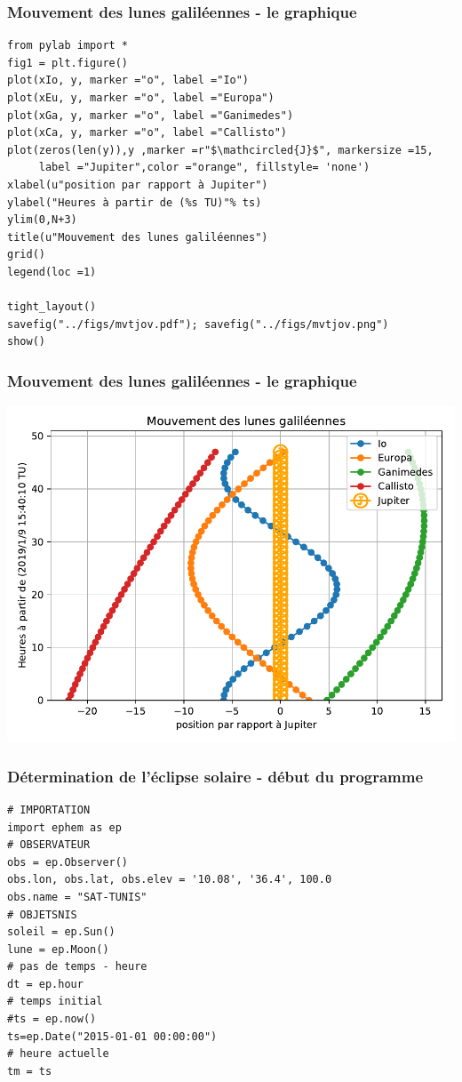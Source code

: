 \documentclass{beamer}
\begin{document}
\begin{frame}
\frametitle{Mouvement des lunes galiléennes - le graphique}

\begin{verbatim}
from pylab import *
fig1 = plt.figure()
plot(xIo, y, marker ="o", label ="Io")
plot(xEu, y, marker ="o", label ="Europa")
plot(xGa, y, marker ="o", label ="Ganimedes")
plot(xCa, y, marker ="o", label ="Callisto")
plot(zeros(len(y)),y ,marker =r"$\mathcircled{J}$", markersize =15,
     label ="Jupiter",color ="orange", fillstyle= 'none')
xlabel(u"position par rapport à Jupiter")
ylabel("Heures à partir de (%s TU)"% ts)
ylim(0,N+3)
title(u"Mouvement des lunes galiléennes")
grid()
legend(loc =1)

tight_layout()
savefig("../figs/mvtjov.pdf"); savefig("../figs/mvtjov.png")
show()
\end{verbatim}
\end{frame}

\begin{frame}
\frametitle{Mouvement des lunes galiléennes - le graphique}

\vspace{6mm}

\centerline{\includegraphics[width=0.9\linewidth]{figs/mvtjov.pdf}}

\vspace{6mm}
\end{frame}

\begin{frame}
\frametitle{Détermination de l'éclipse solaire - début du programme}

\begin{verbatim}
# IMPORTATION
import ephem as ep
# OBSERVATEUR
obs = ep.Observer()
obs.lon, obs.lat, obs.elev = '10.08', '36.4', 100.0
obs.name = "SAT-TUNIS"
# OBJETSNIS
soleil = ep.Sun()
lune = ep.Moon()
# pas de temps - heure
dt = ep.hour
# temps initial
#ts = ep.now()
ts=ep.Date("2015-01-01 00:00:00")
# heure actuelle
tm = ts
\end{verbatim}
\end{frame}
\end{document}
